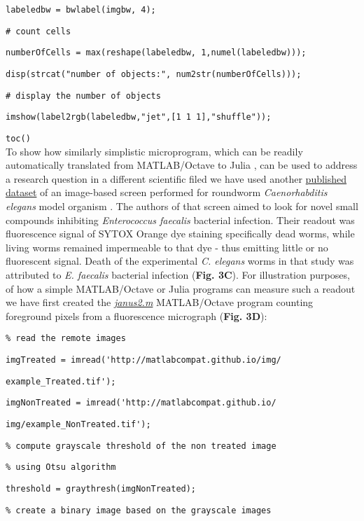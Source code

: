 \verb|labeledbw = bwlabel(imgbw, 4);|

\verb|# count cells|

\verb|numberOfCells = max(reshape(labeledbw, 1,numel(labeledbw)));|

\verb|disp(strcat("number of objects:", num2str(numberOfCells)));|

\verb|# display the number of objects|

\verb|imshow(label2rgb(labeledbw,"jet",[1 1 1],"shuffle"));|

\verb|toc()|\\


To show how similarly simplistic microprogram, which can be readily automatically translated from MATLAB/Octave to Julia , can be used to address a research question in a different scientific filed we have used another \href{http://www.broadinstitute.org/bbbc/BBBC010/}{published dataset} of an image-based screen performed for roundworm \textit{Caenorhabditis elegans} model organism \cite{Moy_2009}. The authors of that screen aimed to look for novel small compounds inhibiting \textit{Enterococcus faecalis} bacterial infection. Their readout was fluorescence signal of SYTOX Orange dye staining specifically dead worms, while living worms remained impermeable to that dye - thus emitting little or no fluorescent signal. Death of the experimental \textit{C. elegans} worms in that study was attributed to \textit{E. faecalis} bacterial infection (\textbf{Fig. 3C}). For illustration purposes, of how a simple MATLAB/Octave or Julia programs can measure such a readout we have first created the \textit{\href{http://}{janus2.m}} MATLAB/Octave program counting foreground pixels from a fluorescence micrograph (\textbf{Fig. 3D}): 

\verb|% read the remote images|

\verb|imgTreated = imread('http://matlabcompat.github.io/img/|

\verb|example_Treated.tif');|

\verb|imgNonTreated = imread('http://matlabcompat.github.io/|

\verb|img/example_NonTreated.tif');|

\verb|% compute grayscale threshold of the non treated image|

\verb|% using Otsu algorithm|

\verb|threshold = graythresh(imgNonTreated);|

\verb|% create a binary image based on the grayscale images|

